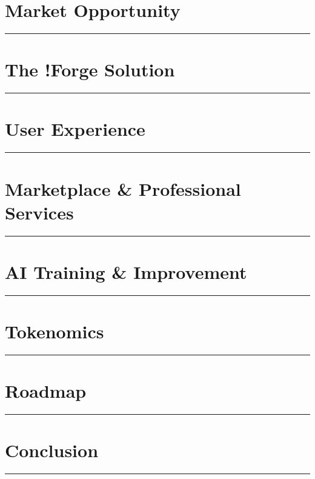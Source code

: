 \documentclass[11pt,a4paper]{article}
\newcommand{\fabSectionrule}{
    \vspace{-1ex}
    \noindent\textcolor{fabAccent}{\rule{\linewidth}{2pt}}
    \vspace{1ex}
}
\begin{document}
\clearpage
\section{Market Opportunity}
\fabSectionrule


\clearpage
\section{The !Forge Solution}
\fabSectionrule


\clearpage
\section{User Experience}
\fabSectionrule


\clearpage
\section{Marketplace \& Professional Services}
\fabSectionrule


\clearpage
\section{AI Training \& Improvement}
\fabSectionrule


\clearpage
\section{Tokenomics}
\fabSectionrule


\clearpage
\section{Roadmap}
\fabSectionrule


\clearpage
\section{Conclusion}
\fabSectionrule

\end{document}
